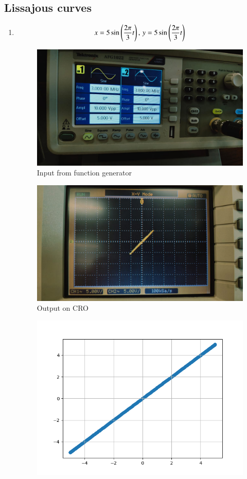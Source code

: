 \documentclass[journal]{IEEEtran}
\begin{document}
\subsection{Lissajous curves}
\begin{enumerate}
    \item \begin{align*}
        x = 5\sin\left(\frac{2\pi}{3}t\right),\,y = 5\sin\left(\frac{2\pi}{3}t\right)
    \end{align*}
    \begin{figure}[h]
        \centering
        \includegraphics[width=0.7\columnwidth]{pics/WhatsApp Image 2025-01-15 at 23.32.36.jpeg}
        \caption{Input from function generator}
    \end{figure}
    \begin{figure}[h]
        \centering
        \includegraphics[width=0.7\columnwidth]{pics/WhatsApp Image 2025-01-15 at 23.32.36(1).jpeg}
        \caption{Output on CRO}
    \end{figure}
    \begin{figure}[H]
        \centering
        \includegraphics[width=0.7\columnwidth]{figs/fig1.png}

\end{figure}
\end{enumerate}
\end{document}

